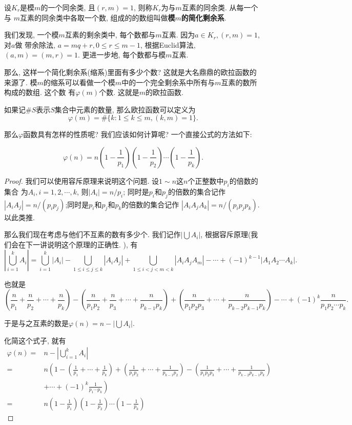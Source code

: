 \begin{definition}
    设$K_r$是模$m$的一个同余类, 且$(r,m)=1$, 则称$K_r$为与$m$互素的同余类. 从每一个与
    $m$互素的同余类中各取一个数, 组成的的数组叫做\textbf{模$m$的简化剩余系}. 
\end{definition}

我们发现, 一个模$m$互素的剩余类中, 每个数都与$m$互素. 因为$a\in K_r, (r,m)=1$, 对$a$做
带余除法, $a=mq+r, 0\leq r\leq m-1$, 根据Euclid算法, $(a,m)=(m,r)=1$. 更进一步地, 
每个数都与模$m$互素. 

那么, 这样一个简化剩余系(缩系)里面有多少个数? 这就是大名鼎鼎的欧拉函数的来源了. 
模$m$的缩系可以看做一个模$m$中的一个完全剩余系中所有与$m$互素的数所构成的数组. 这个数
有$\varphi (m)$个数. 这就是$m$的欧拉函数.

\begin{definition} 如果记$\#S$表示$S$集合中元素的数量, 那么欧拉函数可以定义为
    $$\varphi(m) = \#\{k:1\leq k\leq m, (k, m)=1\}.$$
\end{definition}

那么$\varphi$函数具有怎样的性质呢? 我们应该如何计算呢? 一个直接公式的方法如下: 

\begin{theorem}
    $$
    \varphi(n)=n(1-\frac{1}{p_{1}})(1-\frac{1}{p_{2}})\cdots(1-\frac{1}{p_{k}}).
    $$
\end{theorem}

\begin{proof}
    我们可以使用容斥原理来说明这个问题. 设$1\sim n$这$n$个正整数中$p_i$的倍数的集合
    为$A_i, i=1,2,\cdots, k$, 则$|A_i|=n/p_i$; 同时是$p_i$和$p_j$的倍数的集合记作
    $|A_iA_j|=n/(p_ip_j)$;同时是$p_i$和$p_j$和$p_k$的倍数的集合记作
    $|A_iA_jA_k|=n/(p_ip_jp_k)$. 以此类推. 

    那么我们现在考虑与他们不互素的数有多少个. 我们记作$\left|\bigcup A_i\right|$, 根据容斥原理(我们会在下一讲说明这个原理的正确性. ), 有
    $$\left|\bigcup_{i=1}^k A_i\right|=\bigcup_{i=1}^k|A_i|-\bigcup_{1\leq i\leq j\leq k}|A_iA_j|+\bigcup_{1\leq i<j<m<k}|A_iA_jA_m|-\cdots+(-1)^{k-1}
    |A_1A_2\cdots A_k|.$$
    

    也就是
    $$
    \left(\frac n{p_1}+\frac n{p_2}+\cdots + \frac n{p_k}\right)-
    \left(\frac n{p_1p_2}+\frac n{p_3}+\cdots + \frac n{p_{k-1}p_k}\right)+
    \left(\frac n{p_1p_2p_3}+\cdots + \frac n{p_{k-2}p_{k-1}p_k}\right)-\cdots 
    +(-1)^k\frac{n}{p_1p_2\cdots p_k}. 
    $$

    于是与之互素的数是$\varphi(n)=n-\left|\bigcup A_i\right|$.

    化简这个式子, 就有
    $$\begin{aligned}
        \varphi(n)=&n-\left|\bigcup_{i=1}^k A_i\right|\\
        =&n\left(1-(\frac1{p_1}+\cdots+\frac1{p_k})+(\frac1{p_1p_2}+\cdots+\frac1{p_{k-1}p_2})-(\frac1{p_1p_2p_3}+\cdots+\frac1{p_{k-2}p_{k-1}p_k})\right.\\
        &+\cdots+(-1)^{k}\left.\frac{1}{p_{1}\cdots p_{k}}\right) \\
        =&n(1-\frac{1}{p_{1}})(1-\frac{1}{p_{2}})\cdots(1-\frac{1}{p_{k}})
    \end{aligned}$$
\end{proof}

